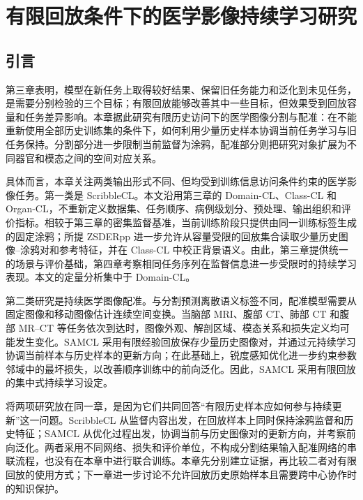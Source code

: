 \chapter{有限回放条件下的医学影像持续学习研究}
\label{chap:task-level-continual-learning}
\setlength{\emergencystretch}{1em}

\section{引言}
\label{sec:task-cl-introduction}

第三章表明，模型在新任务上取得较好结果、保留旧任务能力和泛化到未见任务，是需要分别检验的三个目标；有限回放能够改善其中一些目标，但效果受到回放容量和任务差异影响。本章据此研究有限历史访问下的医学图像分割与配准：在不能重新使用全部历史训练集的条件下，如何利用少量历史样本协调当前任务学习与旧任务保持。分割部分进一步限制当前监督为涂鸦，配准部分则把研究对象扩展为不同器官和模态之间的空间对应关系。

具体而言，本章关注两类输出形式不同、但均受到训练信息访问条件约束的医学影像任务。第一类是 ScribbleCL。本文沿用第三章的 Domain-CL、Class-CL 和 Organ-CL，不重新定义数据集、任务顺序、病例级划分、预处理、输出组织和评价指标。相较于第三章的密集监督基准，当前训练阶段只提供由同一训练标签生成的固定涂鸦；所提 ZSDERpp 进一步允许从容量受限的回放集合读取少量历史图像--涂鸦对和参考特征，并在 Class-CL 中校正背景语义\cite{zhang2026zscribbleseg,cermelli2020mib}。由此，第三章提供统一的场景与评价基础，第四章考察相同任务序列在监督信息进一步受限时的持续学习表现。本文的定量分析集中于 Domain-CL。


第二类研究是持续医学图像配准。与分割预测离散语义标签不同，配准模型需要从固定图像和移动图像估计连续空间变换。当脑部 MRI、腹部 CT、肺部 CT 和腹部 MR--CT 等任务依次到达时，图像外观、解剖区域、模态关系和损失定义均可能发生变化。SAMCL 采用有限经验回放保存少量历史图像对，并通过元持续学习协调当前样本与历史样本的更新方向；在此基础上，锐度感知优化进一步约束参数邻域中的最坏损失，以改善顺序训练中的前向泛化\cite{wang2024samcl,foret2021sam}。因此，SAMCL 采用有限回放的集中式持续学习设定。

将两项研究放在同一章，是因为它们共同回答“有限历史样本应如何参与持续更新”这一问题。ScribbleCL 从监督内容出发，在回放样本上同时保持涂鸦监督和历史特征；SAMCL 从优化过程出发，协调当前与历史图像对的更新方向，并考察前向泛化。两者采用不同网络、损失和评价单位，不构成分割结果输入配准网络的串联流程，也没有在本章中进行联合训练。本章先分别建立证据，再比较二者对有限回放的使用方式；下一章进一步讨论不允许回放历史原始样本且需要跨中心协作时的知识保护。


